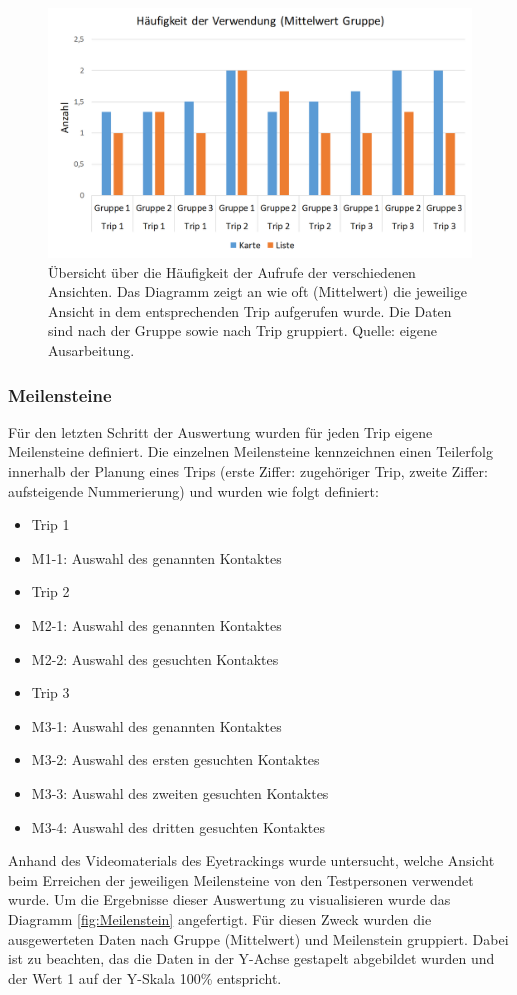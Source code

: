\documentclass[Bachelorarbeit.tex]{subfiles}
\begin{document}
\begin{figure}[H]
\centering
\includegraphics[width=0.7\linewidth]{img/Evaluation/Darstellungsformen/Haufigkeit}
\caption[Häufigkeit der der verwendeten Ansichten]{Übersicht über die Häufigkeit der Aufrufe der verschiedenen Ansichten. Das Diagramm zeigt an wie oft (Mittelwert) die jeweilige Ansicht in dem entsprechenden Trip aufgerufen wurde. Die Daten sind nach der Gruppe sowie nach Trip gruppiert. Quelle: eigene Ausarbeitung.}
\label{fig:Haufigkeit}
\end{figure}
\newpage
\subsubsection{Meilensteine}
\label{Meilensteine} 
Für den letzten Schritt der Auswertung wurden für jeden Trip eigene Meilensteine definiert. 
Die einzelnen Meilensteine kennzeichnen einen Teilerfolg innerhalb der Planung eines Trips (erste Ziffer: zugehöriger Trip, zweite Ziffer: aufsteigende Nummerierung) und wurden wie folgt definiert:

\begin{itemize}
	\item Trip 1
	\item[] M1-1: Auswahl des genannten Kontaktes 
	\item Trip 2
	\item[] M2-1: Auswahl des genannten Kontaktes
	\item[] M2-2: Auswahl des gesuchten Kontaktes
	\item Trip 3
	\item[] M3-1: Auswahl des genannten Kontaktes
	\item[] M3-2: Auswahl des ersten gesuchten Kontaktes
	\item[] M3-3: Auswahl des zweiten gesuchten Kontaktes
	\item[] M3-4: Auswahl des dritten gesuchten Kontaktes
\end{itemize}
Anhand des Videomaterials des Eyetrackings wurde untersucht, welche Ansicht beim Erreichen der jeweiligen Meilensteine von den Testpersonen verwendet wurde. 
Um die Ergebnisse dieser Auswertung zu visualisieren wurde das Diagramm \ref{fig:Meilenstein} angefertigt. 
Für diesen Zweck wurden die ausgewerteten Daten nach Gruppe (Mittelwert) und Meilenstein gruppiert.
Dabei ist zu beachten, das die Daten in der Y-Achse gestapelt abgebildet wurden und der Wert 1 auf der Y-Skala 100\% entspricht. 
\end{document}
